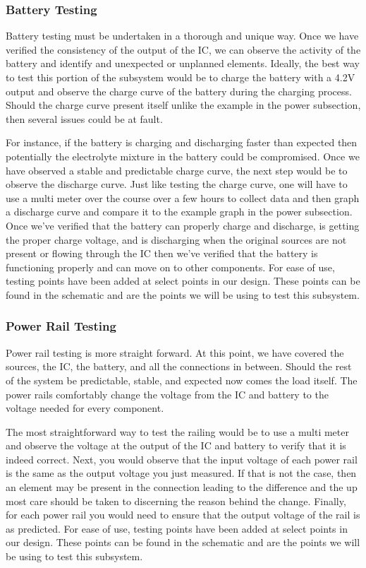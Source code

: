 \subsubsection{Battery Testing}
Battery testing must be undertaken in a thorough and unique way. Once we have verified the consistency of the output of the IC, we can observe the activity of the battery and identify and unexpected or unplanned elements. Ideally, the best way to test this portion of the subsystem would be to charge the battery with a 4.2V output and observe the charge curve of the battery during the charging process. Should the charge curve present itself unlike the example in the power subsection, then several issues could be at fault. 

For instance, if the battery is charging and discharging faster than expected then potentially the electrolyte mixture in the battery could be compromised. Once we have observed a stable and predictable charge curve, the next step would be to observe the discharge curve. Just like testing the charge curve, one will have to use a multi meter over the course over a few hours to collect data and then graph a discharge curve and compare it to the example graph in the power subsection. Once we've verified that the battery can properly charge and discharge, is getting the proper charge voltage, and is discharging when the original sources are not present or flowing through the IC then we've verified that the battery is functioning properly and can move on to other components. For ease of use, testing points have been added at select points in our design. These points can be found in the schematic and are the points we will be using to test this subsystem.

\subsubsection{Power Rail Testing}
Power rail testing is more straight forward. At this point, we have covered the sources, the IC, the battery, and all the connections in between. Should the rest of the system be predictable, stable, and expected now comes the load itself. The power rails comfortably change the voltage from the IC and battery to the voltage needed for every component. 

The most straightforward way to test the railing would be to use a multi meter and observe the voltage at the output of the IC and battery to verify that it is indeed correct.
Next, you would observe that the input voltage of each power rail is the same as the output voltage you just measured. If that is not the case, then an element may be present in the connection leading to the difference and the up most care should be taken to discerning the reason behind the change. Finally, for each power rail you would need to ensure that the output voltage of the rail is as predicted. For ease of use, testing points have been added at select points in our design. These points can be found in the schematic and are the points we will be using to test this subsystem.
